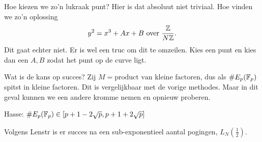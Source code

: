 Hoe kiezen we zo'n lukraak punt? Hier is dat absoluut niet triviaal. 
Hoe vinden we zo'n oplossing
\[
y^2 = x^3 + Ax + B \text{ over } \frac{\mathbb{Z}}{N\mathbb{Z}}
.\] 
Dit gaat echter niet. Er is wel een truc om dit te omzeilen. 
Kies een punt en kies dan een $A, B$ zodat het punt op de curve ligt.

\begin{opmerking}
	Wat is de kans op succes? Zij $M = \text{product van kleine factoren}$,  dus als $\#E_p(\mathbb{F}_p)$ spitst in kleine factoren. 
	Dit is vergelijkbaar met de vorige methodes. Maar in dit geval kunnen we een andere kromme nemen en opnieuw proberen. 
\end{opmerking}
\begin{herinner}
	Hasse: $\#E_p(\mathbb{F}_p) \in [p + 1 - 2 \sqrt{p} , p + 1 + 2 \sqrt{p} ]$
\end{herinner}
Volgens Lenstr is er succes na een sub-exponentieel aantal pogingen, $L_N(\frac{1}{2})$.
